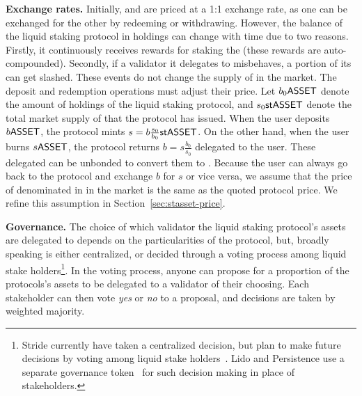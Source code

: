 \noindent
\textbf{Exchange rates.} Initially, \asset and \stasset are priced at a 1:1 exchange rate,
as one can be exchanged for the other by redeeming or withdrawing. However, the balance
of the liquid staking protocol in \asset holdings can change with time due to two reasons.
Firstly, it continuously receives rewards for staking the \asset (these rewards are
auto-compounded). Secondly, if a validator it delegates to misbehaves, a portion of its
\asset can get slashed. These events do not change the supply of \stasset in the market.
The deposit and redemption operations must adjust their price.
Let $b_0 \text{\textsf{ASSET}}$ denote the amount of \asset holdings of the liquid staking
protocol, and $s_0 \text{\textsf{stASSET}}$ denote the total market supply of \stasset that the protocol
has issued. When the user deposits $b \text{\textsf{ASSET}}$, the protocol mints $s = b \frac{s_0}{b_0} \text{\textsf{stASSET}}$.
On the other hand, when the user burns $s \text{\textsf{ASSET}}$, the protocol returns $b = s \frac{b_0}{s_0}$
delegated \asset to the user. These delegated \asset can be unbonded to convert them
to \asset. Because the user can always go back to the protocol and exchange $b$ for $s$ or
vice versa, we assume that the price of \stasset denominated in \asset in the
market is the same as the quoted protocol price. We refine this assumption in
Section~\ref{sec:stasset-price}.

\noindent
\textbf{Governance.}
The choice of which validator the liquid staking protocol's assets are delegated to
depends on the particularities of the protocol, but, broadly speaking
is either centralized, or decided through a voting process among
liquid stake holders\footnote{Stride currently have
taken a centralized decision, but plan to make future decisions by voting
among liquid stake holders~\cite{stride-validators}. Lido and Persistence
use a separate governance token~\cite{lido-validators,persistence-validators} for
such decision making in place of stakeholders.}.
In the voting process, anyone can propose for a proportion of the protocols's assets
to be delegated to a validator of their choosing.
Each stakeholder can then vote \emph{yes} or \emph{no}
to a proposal, and decisions are taken by weighted majority.
